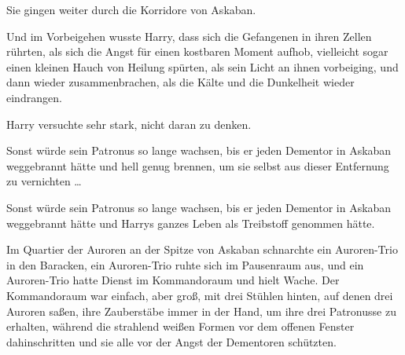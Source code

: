 Sie gingen weiter durch die Korridore von Askaban.

Und im Vorbeigehen wusste Harry, dass sich die Gefangenen in ihren Zellen rührten, als sich die Angst für einen kostbaren Moment aufhob, vielleicht sogar einen kleinen Hauch von Heilung spürten, als sein Licht an ihnen vorbeiging, und dann wieder zusammenbrachen, als die Kälte und die Dunkelheit wieder eindrangen.

Harry versuchte sehr stark, nicht daran zu denken.

Sonst würde sein Patronus so lange wachsen, bis er jeden Dementor in Askaban weggebrannt hätte und hell genug brennen, um sie selbst aus dieser Entfernung zu vernichten …

Sonst würde sein Patronus so lange wachsen, bis er jeden Dementor in Askaban weggebrannt hätte und Harrys ganzes Leben als Treibstoff genommen hätte.

\later

Im Quartier der Auroren an der Spitze von Askaban schnarchte ein Auroren-Trio in den Baracken, ein Auroren-Trio ruhte sich im Pausenraum aus, und ein Auroren-Trio hatte Dienst im Kommandoraum und hielt Wache. Der Kommandoraum war einfach, aber groß, mit drei Stühlen hinten, auf denen drei Auroren saßen, ihre Zauberstäbe immer in der Hand, um ihre drei Patronusse zu erhalten, während die strahlend weißen Formen vor dem offenen Fenster dahinschritten und sie alle vor der Angst der Dementoren schützten.

